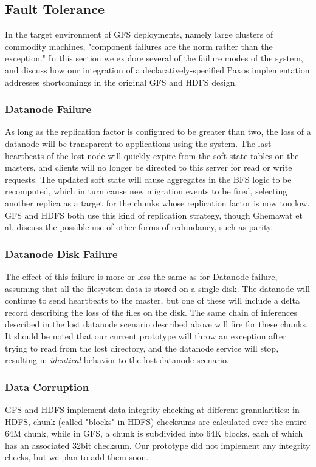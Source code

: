 \documentclass{article}
\begin{document}
\subsection{Fault Tolerance}
In the target environment of GFS deployments, namely large clusters of commodity machines, "component failures are the norm rather than the exception."  In this section we explore several of the failure modes of the system, and discuss how our integration of a declaratively-specified Paxos implementation addresses shortcomings in the original GFS and HDFS design.

\subsubsection{Datanode Failure}
As long as the replication factor is configured to be greater than two, the loss of a datanode will be transparent to applications using the system.  The last heartbeats of the lost node will quickly expire from the soft-state tables on the masters, and clients will no longer be directed to this server for read or write requests.  The updated soft state will cause aggregates in the BFS logic to be recomputed, which in turn cause new migration events to be fired, selecting another replica as a target for the chunks whose replication factor is now too low.  GFS and HDFS both use this kind of replication strategy, though Ghemawat et al. discuss the possible use of other forms of redundancy, such as parity.

\subsubsection{Datanode Disk Failure}
The effect of this failure is more or less the same as for Datanode failure, assuming that all the filesystem data is stored on a single disk.  The datanode will continue to send heartbeats to the master, but one of these will include a delta record describing the loss of the files on the disk.  The same chain of inferences described in the lost datanode scenario described above will fire for these chunks.  It should be noted that our current prototype will throw an exception after trying to read from the lost directory, and the datanode service will stop, resulting in \emph{identical} behavior to the lost datanode scenario.

\subsubsection{Data Corruption}
GFS and HDFS implement data integrity checking at different granularities: in HDFS, chunk (called "blocks" in HDFS) checksums are calculated over the entire 64M chunk, while in GFS, a chunk is subdivided into 64K blocks, each of which has an associated 32bit checksum.  Our prototype did not implement any integrity checks, but we plan to add them soon.
\end{document}

